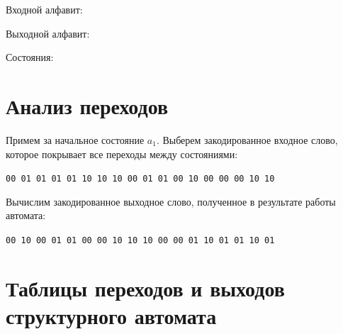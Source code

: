 \documentclass[listings]{labreport}
\begin{document}
Входной алфавит:


Выходной алфавит:


Состояния:


\section*{Анализ переходов}

Примем за начальное состояние $a_1$. Выберем закодированное входное слово,
которое покрывает все переходы между состояниями:

\verb|00 01 01 01 01 10 10 10 00 01 01 00 10 00 00 00 10 10|

Вычислим закодированное выходное слово, полученное в результате
работы автомата:

\verb|00 10 00 01 01 00 00 10 10 10 00 00 01 10 01 01 10 01|

\section*{Таблицы переходов и выходов структурного автомата}
\end{document}
